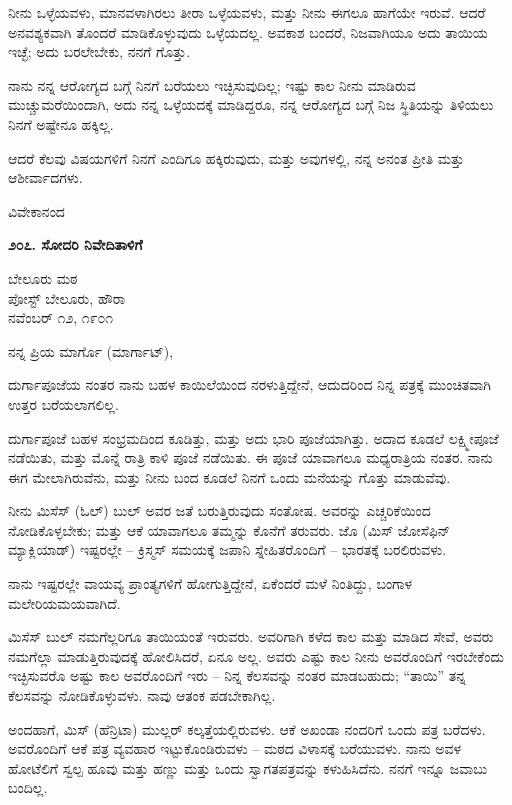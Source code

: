 ನೀನು ಒಳ್ಳೆಯವಳು, ಮಾನವಳಾಗಿರಲು ತೀರಾ ಒಳ್ಳೆಯವಳು, ಮತ್ತು ನೀನು ಈಗಲೂ ಹಾಗೆಯೇ ಇರುವೆ. ಆದರೆ ಅನವಶ್ಯಕವಾಗಿ ತೊಂದರೆ ಮಾಡಿಕೊಳ್ಳುವುದು ಒಳ್ಳೆಯದಲ್ಲ. ಅವಕಾಶ ಬಂದರೆ, ನಿಜವಾಗಿಯೂ ಅದು ತಾಯಿಯ ಇಚ್ಛೆ; ಅದು ಬರಲೇಬೇಕು, ನನಗೆ ಗೊತ್ತು.

ನಾನು ನನ್ನ ಆರೋಗ್ಯದ ಬಗ್ಗೆ ನಿನಗೆ ಬರೆಯಲು ಇಚ್ಛಿಸುವುದಿಲ್ಲ; ಇಷ್ಟು ಕಾಲ ನೀನು ಮಾಡಿರುವ ಮುಚ್ಚುಮರೆಯಿಂದಾಗಿ, ಅದು ನನ್ನ ಒಳ್ಳೆಯದಕ್ಕೆ ಮಾಡಿದ್ದರೂ, ನನ್ನ ಆರೋಗ್ಯದ ಬಗ್ಗೆ ನಿಜ ಸ್ಥಿತಿಯನ್ನು ತಿಳಿಯಲು ನಿನಗೆ ಅಷ್ಟೇನೂ ಹಕ್ಕಿಲ್ಲ.

ಆದರೆ ಕೆಲವು ವಿಷಯಗಳಿಗೆ ನಿನಗೆ ಎಂದಿಗೂ ಹಕ್ಕಿರುವುದು, ಮತ್ತು ಅವುಗಳಲ್ಲಿ, ನನ್ನ ಅನಂತ ಪ್ರೀತಿ ಮತ್ತು ಆಶೀರ್ವಾದಗಳು.

\begin{flushright}
ವಿವೇಕಾನಂದ
\end{flushright}

\begin{center}
\textbf{೨೦೭. ಸೋದರಿ ನಿವೇದಿತಾಳಿಗೆ}
\end{center}

\begin{flushright}
ಬೇಲೂರು ಮಠ\\ಪೋಸ್ಟ್ ಬೇಲೂರು, ಹೌರಾ\\ನವೆಂಬರ್ ೧೨, ೧೯೦೧
\end{flushright}

ನನ್ನ ಪ್ರಿಯ ಮಾರ್ಗೊ (ಮಾರ್ಗಾಟ್),

ದುರ್ಗಾಪೂಜೆಯ ನಂತರ ನಾನು ಬಹಳ ಕಾಯಿಲೆಯಿಂದ ನರಳುತ್ತಿದ್ದೇನೆ, ಆದುದರಿಂದ ನಿನ್ನ ಪತ್ರಕ್ಕೆ ಮುಂಚಿತವಾಗಿ ಉತ್ತರ ಬರೆಯಲಾಗಲಿಲ್ಲ.

ದುರ್ಗಾಪೂಜೆ ಬಹಳ ಸಂಭ್ರಮದಿಂದ ಕೂಡಿತ್ತು, ಮತ್ತು ಅದು ಭಾರಿ ಪೂಜೆಯಾಗಿತ್ತು. ಅದಾದ ಕೂಡಲೆ ಲಕ್ಷ್ಮೀಪೂಜೆ ನಡೆಯಿತು, ಮತ್ತು ಮೊನ್ನೆ ರಾತ್ರಿ ಕಾಳಿ ಪೂಜೆ ನಡೆಯಿತು. ಈ ಪೂಜೆ ಯಾವಾಗಲೂ ಮಧ್ಯರಾತ್ರಿಯ ನಂತರ. ನಾನು ಈಗ ಮೇಲಾಗಿರುವೆನು, ಮತ್ತು ನೀನು ಬಂದ ಕೂಡಲೆ ನಿನಗೆ ಒಂದು ಮನೆಯನ್ನು ಗೊತ್ತು ಮಾಡುವೆವು.

ನೀನು ಮಿಸೆಸ್ (ಓಲ್) ಬುಲ್ ಅವರ ಜತೆ ಬರುತ್ತಿರುವುದು ಸಂತೋಷ. ಅವರನ್ನು ಎಚ್ಚರಿಕೆಯಿಂದ ನೋಡಿಕೊಳ್ಳಬೇಕು; ಮತ್ತು ಆಕೆ ಯಾವಾಗಲೂ ತಮ್ಮನ್ನು ಕೊನೆಗೆ ತರುವರು. ಜೊ (ಮಿಸ್ ಜೋಸೆಫಿನ್ ಮ್ಯಾಕ್ಲಿಯಾಡ್) ಇಷ್ಟರಲ್ಲೇ – ಕ್ರಿಸ್ಮಸ್ ಸಮಯಕ್ಕೆ ಜಪಾನಿ ಸ್ನೇಹಿತರೊಂದಿಗೆ – ಭಾರತಕ್ಕೆ ಬರಲಿರುವಳು.

ನಾನು ಇಷ್ಟರಲ್ಲೇ ವಾಯವ್ಯ ಪ್ರಾಂತ್ಯಗಳಿಗೆ ಹೋಗುತ್ತಿದ್ದೇನೆ, ಏಕೆಂದರೆ ಮಳೆ ನಿಂತಿದ್ದು, ಬಂಗಾಳ ಮಲೇರಿಯಮಯವಾಗಿದೆ.

ಮಿಸೆಸ್ ಬುಲ್ ನಮಗೆಲ್ಲರಿಗೂ ತಾಯಿಯಂತೆ ಇರುವರು. ಅವರಿಗಾಗಿ ಕಳೆದ ಕಾಲ ಮತ್ತು ಮಾಡಿದ ಸೇವೆ, ಅವರು ನಮಗೆಲ್ಲಾ ಮಾಡುತ್ತಿರುವುದಕ್ಕೆ ಹೋಲಿಸಿದರೆ, ಏನೂ ಅಲ್ಲ. ಅವರು ಎಷ್ಟು ಕಾಲ ನೀನು ಅವರೊಂದಿಗೆ ಇರಬೇಕೆಂದು ಇಚ್ಛಿಸುವರೊ ಅಷ್ಟು ಕಾಲ ಅವರೊಂದಿಗೆ ಇರು – ನಿನ್ನ ಕೆಲಸವನ್ನು ನಂತರ ಮಾಡಬಹುದು; “ತಾಯಿ” ತನ್ನ ಕೆಲಸವನ್ನು ನೋಡಿಕೊಳ್ಳುವಳು. ನಾವು ಆತಂಕ ಪಡಬೇಕಾಗಿಲ್ಲ.

ಅಂದಹಾಗೆ, ಮಿಸ್ (ಹೆನ್ರಿಟಾ) ಮುಲ್ಲರ್ ಕಲ್ಕತ್ತೆಯಲ್ಲಿರುವಳು. ಆಕೆ ಅಖಂಡಾ ನಂದರಿಗೆ ಒಂದು ಪತ್ರ ಬರೆದಳು. ಅವರೊಂದಿಗೆ ಆಕೆ ಪತ್ರ ವ್ಯವಹಾರ ಇಟ್ಟುಕೊಂಡಿರುವಳು – ಮಠದ ವಿಳಾಸಕ್ಕೆ ಬರೆಯುವಳು. ನಾನು ಅವಳ ಹೋಟೆಲಿಗೆ ಸ್ವಲ್ಪ ಹೂವು ಮತ್ತು ಹಣ್ಣು ಮತ್ತು ಒಂದು ಸ್ವಾಗತಪತ್ರವನ್ನು ಕಳುಹಿಸಿದೆನು. ನನಗೆ ಇನ್ನೂ ಜವಾಬು ಬಂದಿಲ್ಲ.

